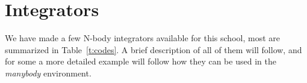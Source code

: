 \chapter                {Integrators}

We have made a few N-body integrators available for this school, most 
are summarized
in Table~\ref{t:codes}. A brief description of all of them will follow, and 
for some a more detailed example will follow how they
can be used in the {\it manybody} environment. 




